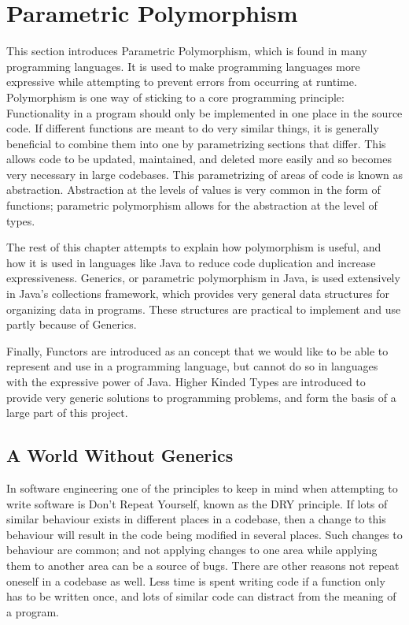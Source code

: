 \chapter{Parametric Polymorphism}\label{sec:poly}
This section introduces Parametric Polymorphism, which is found in many
programming languages. It is used to make programming languages more expressive
while attempting to prevent errors from occurring at runtime.  Polymorphism is
one way of sticking to a core programming principle: Functionality in a program
should only be implemented in one place in the source code. If different
functions are meant to do very similar things, it is generally beneficial to
combine them into one by parametrizing sections that differ. This allows code
to be updated, maintained, and deleted more easily and so becomes very
necessary in large codebases.  This parametrizing of areas of code is known as
abstraction. Abstraction at the levels of values is very common in the form of
functions; parametric polymorphism allows for the abstraction at the level of
types.

The rest of this chapter attempts to explain how polymorphism is useful, and
how it is used in languages like Java to reduce code duplication and increase
expressiveness. Generics, or parametric polymorphism in Java, is used
extensively in Java's collections framework, which provides very general data
structures for organizing data in programs. These structures are practical to
implement and use partly because of Generics.

Finally, Functors are introduced as an concept that we would like to be able to
represent and use in a programming language, but cannot do so in languages with
the expressive power of Java. Higher Kinded Types are introduced to provide
very generic solutions to programming problems, and form the basis of a large
part of this project.

\section{A World Without Generics}\label{sec:nopoly}
In software engineering one of the principles to keep in mind when attempting
to write software is Don't Repeat Yourself, known as the DRY principle. If lots
of similar behaviour exists in different places in a codebase, then a change to
this behaviour will result in the code being modified in several places.  Such
changes to behaviour are common; and not applying changes to one area while
applying them to another area can be a source of bugs. There are other reasons
not repeat oneself in a codebase as well. Less time is spent writing code if a
function only has to be written once, and lots of similar code can distract
from the meaning of a program.

